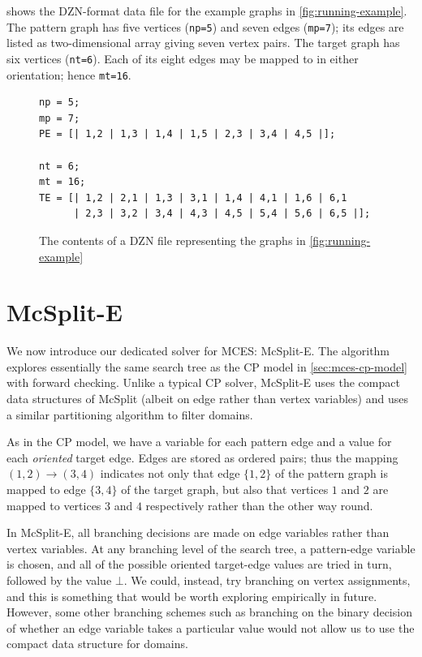  shows the DZN-format data file for the example graphs in \cref{fig:running-example}.
The pattern graph has five vertices (\texttt{np=5}) and seven edges (\texttt{mp=7}); its edges
are listed as two-dimensional array giving seven vertex pairs.  The target graph has six vertices (\texttt{nt=6}).
Each of its eight edges may be mapped to in either orientation; hence \texttt{mt=16}.

\begin{figure}[htb]
\vspace{.8em}
\footnotesize
\centering
\begin{BVerbatim}
np = 5;
mp = 7;
PE = [| 1,2 | 1,3 | 1,4 | 1,5 | 2,3 | 3,4 | 4,5 |];

nt = 6;
mt = 16;
TE = [| 1,2 | 2,1 | 1,3 | 3,1 | 1,4 | 4,1 | 1,6 | 6,1
      | 2,3 | 3,2 | 3,4 | 4,3 | 4,5 | 5,4 | 5,6 | 6,5 |];
\end{BVerbatim}
\caption{The contents of a DZN file representing the graphs in \cref{fig:running-example}}\label{fig:dzn-model3}
\end{figure}

\section{McSplit-E}\label{sec:mcsplit-e}

We now introduce our dedicated solver for MCES: McSplit-E.
The algorithm explores essentially the same search tree as the CP
model in \cref{sec:mces-cp-model} with forward checking.  Unlike a typical CP
solver, McSplit-E uses the compact data structures of McSplit \cite{DBLP:conf/ijcai/McCreeshPT17}
(albeit on edge rather than vertex variables) and uses a similar partitioning
algorithm to filter domains.

As in the CP model, we have a variable for each pattern edge and a value
for each \textit{oriented} target edge.  Edges are stored as ordered pairs; thus the mapping
$(1,2) \rightarrow (3,4)$ indicates not only that edge $\{1,2\}$ of the pattern graph is
mapped to edge $\{3,4\}$ of the target graph, but also that vertices $1$ and $2$ are mapped
to vertices $3$ and $4$ respectively rather than the other way round.

In McSplit-E, all branching decisions are made on edge variables rather than vertex variables.
At any branching level of the search tree, a pattern-edge variable is chosen, and all of the possible
oriented target-edge values are tried in turn, followed by the value
$\bot$.  We could, instead, try branching on vertex assignments, and this is
something that would be worth exploring empirically in future.  However, some other
branching schemes such as branching on the binary decision of whether an edge variable takes
a particular value would not allow us to use the compact data structure for domains.

